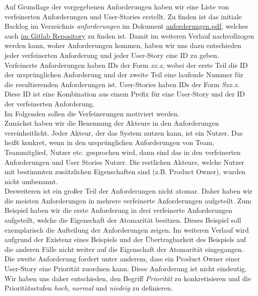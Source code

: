 \documentclass{article}
\begin{document}
Auf Grundlage der vorgegebenen Anforderungen haben wir eine Liste von verfeinerten Anforderungen und User-Stories erstellt.
Zu finden ist das initiale Backlog im Verzeichnis \textit{anforderungen} im Dokument \linebreak \href{run:./../anforderungen/anforderungen.pdf}{anforderungen.pdf}, welches auch \href{https://git.informatik.uni-rostock.de/softwaretechnik-ws-2025-26/uebung3/team3/projekt-team3-uebung3/-/blob/main/anforderungen/anforderungen.pdf?ref_type=heads}{im Gitlab Repository} zu finden ist.
Damit im weiteren Verlauf nachvollzogen werden kann, woher Anforderungen kommen, haben wir uns dazu entschieden jeder verfeinerten Anforderung und jeder User-Story eine ID zu geben.
Verfeinerte Anforderungen haben IDs der Form \textit{xx.x}, wobei der erste Teil die ID der ursprünglichen Anforderung und der zweite Teil eine laufende Nummer für die resultierenden Anforderungen ist.
User-Stories haben IDs der Form \textit{Sxx.x}.
Diese ID ist eine Kombination aus einem Prefix für eine User-Story und der ID der verfeinerten Anforderung.\\
Im Folgenden sollen die Verfeinerungen motiviert werden.\\
Zunächst haben wir die Benennung der Akteure in den Anforderungen vereinheitlicht.
Jeder Akteur, der das System nutzen kann, ist ein Nutzer.
Das heißt konkret, wenn in den ursprünglichen Anforderungen von Team, Teammitglied, Nutzer etc. gesprochen wird, dann sind das in den verfeinerten Anforderungen und User Stories Nutzer.
Die restlichen Akteure, welche Nutzer mit bestimmten zusätzlichen Eigenschaften sind (z.B. Product Owner), wurden nicht umbenannt.\\
Desweiteren ist ein großer Teil der Anforderungen nicht atomar.
Daher haben wir die meisten Anforderungen in mehrere verfeinerte Anforderungen aufgeteilt.
Zum Beispiel haben wir die erste Anforderung in drei verfeinerte Anforderungen aufgeteilt, welche die Eigenschaft der Atomarität besitzen.
Dieses Beispiel soll exemplarisch die Aufteilung der Anforderungen zeigen.
Im weiteren Verlauf wird aufgrund der Existenz eines Beispiels und der Übertragbarkeit des Beispiels auf die anderen Fälle nicht weiter auf die Eigenschaft der Atomarität eingegangen.\\
Die zweite Anforderung fordert unter anderem, dass ein Product Owner einer User-Story eine Priorität zuordnen kann.
Diese Anforderung ist nicht eindeutig.
Wir haben uns daher entschieden, den Begriff \textit{Priorität} zu konkretisieren und die Prioritätsstufen \textit{hoch}, \textit{normal} und \textit{niedrig} zu definieren.\\
\end{document}
